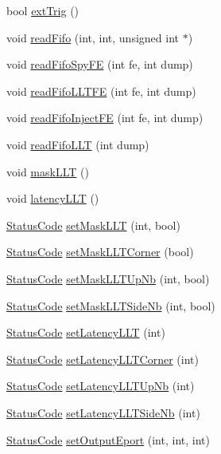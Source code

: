 \begin{DoxyCompactItemize}
\item 
bool \hyperlink{classFEB__v1_a481e089490ae958c7606f11d27c9db9a}{extTrig} ()
\item 
void \hyperlink{classFEB__v1_af945f99a912c5ad076ebdb03dbb6c139}{readFifo} (int, int, unsigned int $\ast$)
\item 
void \hyperlink{classFEB__v1_a86e0ed4fc9946a184d82cefdf5e5a794}{readFifoSpyFE} (int fe, int dump)
\item 
void \hyperlink{classFEB__v1_a27df6aecacccf3415ff98092b7da5485}{readFifoLLTFE} (int fe, int dump)
\item 
void \hyperlink{classFEB__v1_ab370d9f02895e1a44ab19d320255123e}{readFifoInjectFE} (int fe, int dump)
\item 
void \hyperlink{classFEB__v1_a449a15db7087e4dbe6af0b0f96ec2038}{readFifoLLT} (int dump)
\item 
void \hyperlink{classFEB__v1_a14807bfa77f92bb82428c39abea5df88}{maskLLT} ()
\item 
void \hyperlink{classFEB__v1_a42cc3f61fd94d4de68eb605b04fb1e74}{latencyLLT} ()
\item 
\hyperlink{classStatusCode}{StatusCode} \hyperlink{classFEB__v1_a5a177c98b2be429aacbb3d652f40b247}{setMaskLLT} (int, bool)
\item 
\hyperlink{classStatusCode}{StatusCode} \hyperlink{classFEB__v1_ad078f7c2086dd78375da9d9d82b78d23}{setMaskLLTCorner} (bool)
\item 
\hyperlink{classStatusCode}{StatusCode} \hyperlink{classFEB__v1_a904bff89e5ad45ce78730502dc26a0e3}{setMaskLLTUpNb} (int, bool)
\item 
\hyperlink{classStatusCode}{StatusCode} \hyperlink{classFEB__v1_a519a955361c420680af64c7fa9410784}{setMaskLLTSideNb} (int, bool)
\item 
\hyperlink{classStatusCode}{StatusCode} \hyperlink{classFEB__v1_abf7b8a0e6842ecf74a2b1889fbb9a722}{setLatencyLLT} (int)
\item 
\hyperlink{classStatusCode}{StatusCode} \hyperlink{classFEB__v1_a935e78031961cff9330e82a70bf91052}{setLatencyLLTCorner} (int)
\item 
\hyperlink{classStatusCode}{StatusCode} \hyperlink{classFEB__v1_a8a3aafdda0f1028e02c4a5850f987f32}{setLatencyLLTUpNb} (int)
\item 
\hyperlink{classStatusCode}{StatusCode} \hyperlink{classFEB__v1_a840532b78d0062646116a076e65cf353}{setLatencyLLTSideNb} (int)
\item 
\hyperlink{classStatusCode}{StatusCode} \hyperlink{classFEB__v1_ae94205e374c3438e910aa39a889ebf5c}{setOutputEport} (int, int, int)

\end{DoxyCompactItemize}
